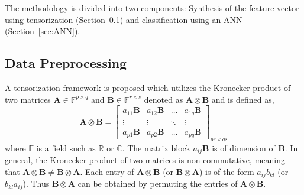 
The methodology is divided into two components: Synthesis of the feature vector using tensorization (Section~\ref{sec:tensor}) and classification using an ANN (Section~\ref{sec:ANN}). 
\subsection{Data Preprocessing}
\label{sec:tensor}
A tensorization framework is proposed which utilizes the Kronecker product of two matrices $\mathbf{A} \in \mathbb{F}^{p\times q}$ and $\mathbf{B} \in \mathbb{F}^{r \times s}$ denoted as $\mathbf{A} \otimes \mathbf{B}$ and is defined as, 
%
\begin{equation} 
\mathbf{A} \otimes \mathbf{B} = \left[\begin{array}{rrrr}
a_{11} \mathbf{B}  & a_{12}\mathbf{B}  & \dots  & a_{1q} \mathbf{B}\\
\vdots  & \vdots   & \ddots   & \vdots\\
a_{p1} \mathbf{B} & a_{p2}\mathbf{B} & \dots & a_{pq} \mathbf{B}      
\end{array}\right]_{pr \times qs}
\end{equation}  
%
where $\mathbb{F}$ is a field such as $\mathbb{R}$ or $\mathbb{C}$. The matrix block  $a_{ij}\mathbf{B}$ is of dimension of $\mathbf{B}$.
In general, the Kronecker product of two matrices is non-commutative, meaning that $\mathbf{A}\otimes \mathbf{B} \ne \mathbf{B}\otimes \mathbf{A}$. Each entry of $\mathbf{A} \otimes \mathbf{B}$ (or $\mathbf{B}\otimes \mathbf{A}$) is of the form $a_{ij}b_{kl}$ (or $b_{kl}a_{ij}$). Thus $\mathbf{B}\otimes \mathbf{A}$ can be obtained by permuting the entries of $\mathbf{A}\otimes \mathbf{B}$.

